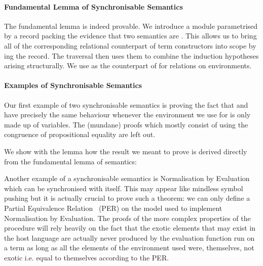 \paragraph{Fundamental Lemma of Synchronisable Semantics}
The fundamental lemma is indeed provable. We introduce a 
module parametrised by a record packing the evidence that two semantics are
. This allows us to bring all of the corresponding relational
counterpart of term constructors into scope by ing the record. The
traversal then uses them to combine the induction hypotheses arising structurally.
We use  as the counterpart of  for relations on environments.


\paragraph{Examples of Synchronisable Semantics}

Our first example of two synchronisable semantics is proving the
fact that  and  have precisely the
same behaviour whenever the environment we use for 
is only made up of variables. The (mundane) proofs which mostly
consist of using the congruence of propositional equality are
left out.


We show with the lemma  how the result
we meant to prove is derived directly from the fundamental lemma of
 semantics:


Another example of a synchronisable semantics is Normalisation by Evaluation
which can be synchronised with itself. This may appear like mindless symbol
pushing but it is actually crucial to prove such a theorem: we can only
define a Partial Equivalence Relation~\cite{mitchell1996foundations} (PER)
on the model used to implement Normalisation by Evaluation. The proofs of
the more complex properties of the procedure will rely heavily on the fact
that the exotic elements that may exist in the host language are actually
never produced by the evaluation function run on a term as long as all the
elements of the environment used were, themselves, not exotic i.e. equal to
themselves according to the PER.

